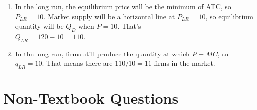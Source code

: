 \documentclass{article}
\begin{document}
\begin{enumerate}
\begin{enumerate}
	\item In the long run, the equilibrium price will be the minimum of ATC, so $P_{LR} = 10$. Market supply will be a horizontal line at $P_{LR} = 10$, so equilibrium quantity will be $Q_D$ when $P = 10$. That's \\ $Q_{LR} = 120 - 10 = 110$.
	
	\item In the long run, firms still produce the quantity at which $P = MC$, so $q_{LR} = 10$. That means there are $110/10 = 11$ firms in the market.
	
	\end{enumerate}

\end{enumerate}

\section*{Non-Textbook Questions}
\end{document}

